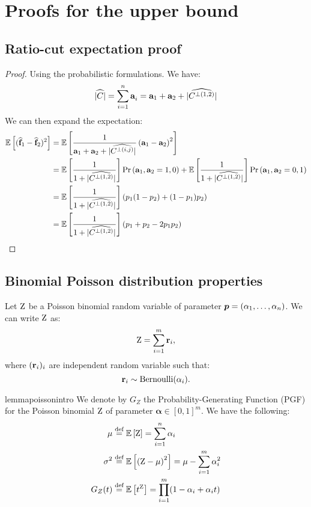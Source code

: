 \section{Proofs for the upper bound}
\subsection{Ratio-cut expectation proof}
\label{appendix:diffexpect}
\diffexpect*
\begin{proof}
	Using the probabilistic formulations. We have:
	\[
		\widehat{|C|} = \sum_{i=1}^{n} {\mathbf{a}}^{}_i = {\mathbf{a}}_1  + {\mathbf{a}}_2
		+ \widehat{|C^{\perp(1,2)}|}
	\]
	We can then expand the expectation:
	\begin{align*}
		\mathbb{E}\left[(\widehat{{\mathbf{f}}}_1-\widehat{{\mathbf{f}}}_2)^2\right]
		 & = \mathbb{E}\left[{\frac{1}{{\mathbf{a}}_1+{\mathbf{a}}_2 + \widehat{|C^{\perp(i,j)}|}}}\left({\mathbf{a}}_1-{\mathbf{a}}_2\right)^2\right] \\
		 & = \mathbb{E}\left[{\frac{1}{1+\widehat{|C^{\perp(1,2)}|}}}\right] \operatorname{Pr}\left({\mathbf{a}}_1,{\mathbf{a}}_2 = 1,0\right)
		+  \mathbb{E}\left[{\frac{1}{1+\widehat{|C^{\perp(1,2)}|}}}\right] \operatorname{Pr}\left({\mathbf{a}}_1,{\mathbf{a}}_2 = 0,1\right)           \\
		 & = \mathbb{E}\left[{\frac{1}{1+\widehat{|C^{\perp(1,2)}|}}}\right]\left(p_1 (1-p_2) + (1-p_1)p_2\right)      \\
		 & = \mathbb{E}\left[{\frac{1}{1+\widehat{|C^{\perp(1,2)}|}}}\right]\left(p_1+p_2-2p_1p_2\right)
	\end{align*}
\end{proof}
\subsection{Binomial Poisson distribution properties} \label{appendix:poissonprop}
Let ${\textnormal{Z}}$ be a Poisson binomial random variable of parameter
${\bm{p}}=(\alpha_1,\ldots,\alpha_n)$. We can write ${\textnormal{Z}}$ as:
\[
	{\textnormal{Z}}=\sum_{i=1}^m {\mathbf{r}}_i,
\]
where $({\mathbf{r}}_i)_i$ are independent random variable such that:
\[
	{\mathbf{r}}_i \sim \text{Bernoulli}(\alpha_i).
\]
\begin{restatable}{lemma}{poissonintro}
	\label{lemma:poissonintro}
	We denote by $G_Z$ the Probability-Generating Function (PGF) for the Poisson binomial
	${\textnormal{Z}}$ of parameter $\bm\alpha\in[0,1]^m$. We have the following:
	{\footnotesize
	\begin{align*}
		\mu      & \stackrel{\text{def}}{=} \mathbb{E}\left[{\textnormal{Z}}\right] = \sum_{i=1}^n \alpha_i                     \\
		\sigma^2 & \stackrel{\text{def}}{=} \mathbb{E}\left[\left({\textnormal{Z}}-\mu\right)^2\right] = \mu - \sum_{i=1}^m \alpha^2_i \\
		G_Z(t)   & \stackrel{\text{def}}{=} \mathbb{E}\left[t^{\textnormal{Z}}\right] = \prod_{i=1}^m (1-\alpha_i+\alpha_i t)
	\end{align*}
	}
\end{restatable}

